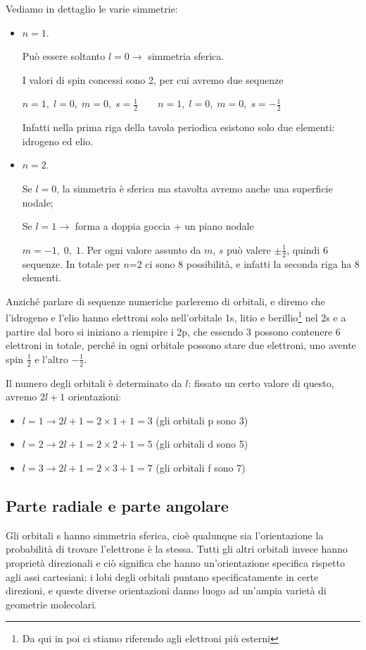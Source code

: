 Vediamo in dettaglio le varie simmetrie:
\begin{itemize}
  \item $n=1$.
  
  Può essere soltanto $l=0 \rightarrow$ simmetria sferica.
  
  I valori di spin concessi sono 2, per cui avremo due sequenze

$n=1, \; l=0, \; m=0, \; s=\frac{1}{2} \qquad n=1, \; l=0, \; m=0, \; s=-\frac{1}{2}$

Infatti nella prima riga della tavola periodica esistono solo due elementi: idrogeno ed elio.
\item $n=2$.

Se $l=0$, la simmetria è sferica ma stavolta avremo anche una superficie nodale;

Se $l=1 \rightarrow$ forma a doppia goccia + un piano nodale

$m=-1, \; 0,\; 1$. Per ogni valore assunto da $m$, $s$ può valere $\pm\frac{1}{2}$, quindi 6 sequenze.
In totale per $n$=2 ci sono 8 possibilità, e infatti la seconda riga ha 8 elementi.
\end{itemize}
Anziché parlare di sequenze numeriche parleremo di orbitali, e diremo che l'idrogeno e l'elio hanno elettroni solo nell'orbitale 1s, litio e berillio\footnote{Da qui in poi ci stiamo riferendo agli elettroni più esterni} nel 2s e a partire dal boro si iniziano a riempire i 2p, che essendo 3 possono contenere 6 elettroni in totale, perché in ogni orbitale possono stare due elettroni, uno avente spin $\frac{1}{2}$ e l'altro $-\frac{1}{2}$.

Il numero degli orbitali è determinato da $l$: fissato un certo valore di questo, avremo $2l+1$ orientazioni:
\begin{itemize}
  \item $l=1 \rightarrow 2l+1=2\times1 + 1=3$ (gli orbitali p sono 3)
  \item $l=2 \rightarrow 2l+1=2\times2 + 1=5$ (gli orbitali d sono 5)
  \item $l=3 \rightarrow 2l+1=2\times3 + 1=7$ (gli orbitali f sono 7)
\end{itemize}
\newpage
\subsection{Parte radiale e parte angolare}
Gli orbitali s hanno simmetria sferica, cioè qualunque sia l'orientazione la probabilità di trovare l'elettrone è la stessa. Tutti gli altri orbitali invece hanno proprietà direzionali e ciò significa che hanno un'orientazione specifica rispetto agli assi cartesiani: i lobi degli orbitali puntano specificatamente in certe direzioni, e queste diverse orientazioni danno luogo ad un'ampia varietà di geometrie molecolari.

